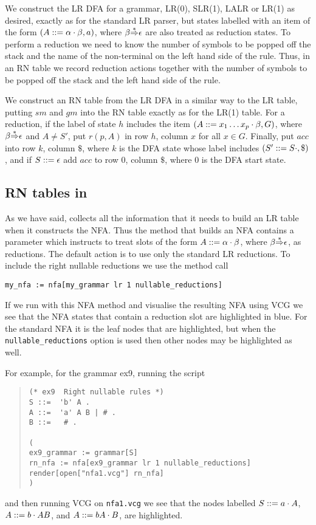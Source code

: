 We construct the LR DFA for a grammar, LR(0), SLR(1), LALR or LR(1) as
desired, exactly as for the standard LR parser, but states labelled
with an item of the form $(A::=\alpha\cdot\beta,a)$, where
$\beta{\mathop{\Rightarrow}\limits^*}\epsilon$ are also treated as reduction states. 
To perform a reduction we need to know the number of symbols to be
popped off the stack and the name of the non-terminal on the left
hand side of the rule. Thus, in an RN table we record reduction
actions together with the number of symbols to be popped off the stack
and the left hand side of the rule. 

We construct an RN table from the LR DFA in a similar way to the LR
table, putting $sm$ and $gm$ into the RN table exactly as 
for the LR(1) table. For a reduction,
if the label of state $h$ includes the item
$(A::= x_1\ldots x_p\cdot\beta,G)$, where $\beta{\mathop{\Rightarrow}\limits^*}\epsilon$
and $A\not= S'$, put $r(p,A)$ in row $h$, column $x$ for all $x\in G$.
Finally, put $acc$ into row $k$, column $\$$, where $k$ is the DFA
state whose label includes $(S'::= S\cdot,\$)$, and if
$S::=\epsilon$ add $acc$ to row 0, column $\$$, where 0 is the DFA
start state.


\subsection{RN tables in \gtb}\label{RNtab}

As we have said, \gtb collects all the information that it needs to
build an LR table when it constructs the NFA. Thus the method
that builds an NFA contains a parameter which instructs \gtb to treat
slots of the form $A::=\alpha\cdot\beta$, where
$\beta{\mathop{\Rightarrow}\limits^*}\epsilon$, as reductions. The default action is to use
only the standard LR reductions. To include the right nullable
reductions we use the method call
\begin{center}
\verb+my_nfa := nfa[my_grammar lr 1 nullable_reductions]+
\end{center}

If we run \gtb with this NFA method and visualise the resulting NFA
using VCG we see that the NFA states that contain a reduction slot
are highlighted in blue. For the standard NFA it is the leaf nodes
that are highlighted, but when the \verb+nullable_reductions+ option is
used then other nodes may be highlighted as well.

For example, for the grammar ex9, running the script
\begin{quote}
\begin{verbatim}
(* ex9  Right nullable rules *)
S ::=  'b' A .
A ::=  'a' A B | # .
B ::=   # .

(
ex9_grammar := grammar[S]
rn_nfa := nfa[ex9_grammar lr 1 nullable_reductions]
render[open["nfa1.vcg"] rn_nfa]
)
\end{verbatim}
\end{quote}
and then running VCG on \verb+nfa1.vcg+ we see that
the nodes labelled $S::= a\cdot A$, $A::= b\cdot AB$, 
and $A::= bA\cdot B$, are highlighted.
\begin{center}
\\[2mm]
\end{center}

